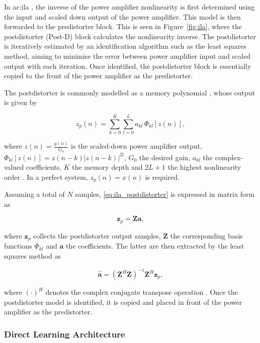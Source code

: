 In \gls{ac:ila} \cite{ding2004}, the inverse of the power amplifier nonlinearity is first determined using the input and scaled down output of the power amplifier. This model is then forwarded to the predistorter block. This is seen in Figure~\ref{fig:ila}, where the postdistorter (Post-D) block calculates the nonlinearity inverse. The postdistorter is iteratively estimated by an identification algorithm such as the least squares method, aiming to minimise the error between power amplifier input and scaled output with each iteration. Once identified, the postdistorter block is essentially copied to the front of the power amplifier as the predistorter.

The postdistorter is commonly modelled as a memory polynomial \cite{ding2004}, whose output is given by

\begin{equation}
  z_p(n) = \sum_{k=0}^{K}\sum_{l=0}^{L} a_{kl}\,\Phi_{kl}\!\left[z(n)\right],
  \label{eq:ila_postdistorter}
\end{equation}

where $z(n) = \frac{y(n)}{G_0}$ is the scaled-down power amplifier output, $\Phi_{kl}[z(n)] = z(n-k)|z(n-k)|^{2l}$, $G_0$ the desired gain, $a_{kl}$ the complex-valued coefficients, $K$ the memory depth and $2L+1$ the highest nonlinearity order \cite{feng2016}. In a perfect system, $z_p(n) = x(n)$ is required.

Assuming a total of $N$ samples, \eqref{eq:ila_postdistorter} is expressed in matrix form as

\begin{equation}
  \mathbf{z}_p = \mathbf{Z}\mathbf{a},
  \label{eq:ila_matrix}
\end{equation}

where $\mathbf{z}_p$ collects the postdistorter output samples, $\mathbf{Z}$ the corresponding basis functions $\Phi_{kl}$ and $\mathbf{a}$ the coefficients. The latter are then extracted by the least squares method as

\begin{equation}
  \hat{\mathbf{a}} = \left(\mathbf{Z}^H\mathbf{Z}\right)^{-1}\mathbf{Z}^H\mathbf{z}_p,
  \label{eq:ila_least_squares}
\end{equation}

where $(\cdot)^H$ denotes the complex conjugate transpose operation \cite{feng2016}. Once the postdistorter model is identified, it is copied and placed in front of the power amplifier as the predistorter. 

\subsubsection{Direct Learning Architecture}\label{sec:direct_learning_architecture}

